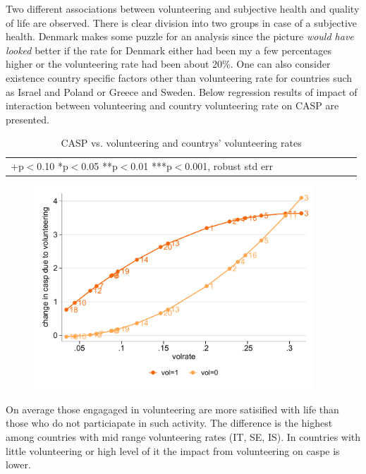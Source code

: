\documentclass[10pt, letterpaper]{article}
\begin{document}
\begin{spacing}{1.4}
Two different  associations between volunteering and subjective health and quality of life are observed.  There is clear division into two groups in case of a subjective health. Denmark makes some puzzle for an analysis since the picture \textit{would have looked} better if the rate for Denmark either had been my a few percentages higher or the volunteering rate had been about 20\%. One can also consider existence country specific factors other than volunteering rate for countries such as Israel and Poland or Greece and Sweden. Below regression results of impact of interaction between volunteering and country volunteering rate on CASP are presented. 


\begin{spacing}{.9}
\begin{table}[H]
\centering 
\caption{CASP vs. volunteering and countrys' volunteering rates}  
\begin{scriptsize} 
	\begin{tabular}{p{1.8in}p{.5in}p{.5in}p{.5in}p{.5in}p{.5in}p{.5in}p{.5in}p{.5in}p{.5in}p{.4in}p{.5in}p{.4in}}\hline
	 
      \hline\multicolumn{5}{l}{+p$<$0.10 *p$<$0.05 **p$<$0.01 ***p$<$0.001, robust std err} 		 	\end{tabular}
      \label{regB} 
\end{scriptsize}\end{table}
\end{spacing}

\begin{figure}[H]
 \includegraphics[height=3in]{regHm1.pdf}
 \centering\label{fig:m1}
\caption{}
\end{figure}
 
On average those engagaged in volunteering are more satisified with life than those who do not particiapate in such activity. The difference is the highest among countries with mid range volunteering rates (IT, SE, IS). In countries with little volunteering or high level of it the impact from volunteering on caspe is lower.   


\end{spacing}
\end{document}
